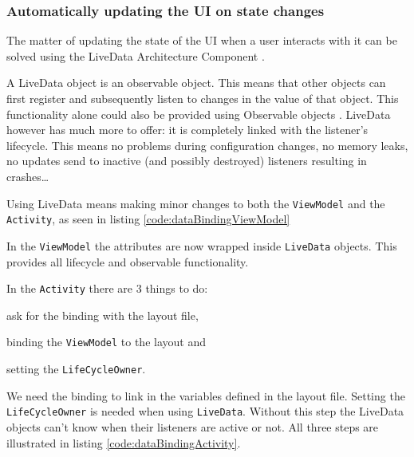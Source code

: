 \subsubsection{Automatically updating the UI on state changes}
The matter of updating the state of the UI when a user interacts with it can be solved using the LiveData Architecture Component \cite{liveData}.

A LiveData object is an observable object. This means that other objects can first register and subsequently listen to changes in the value of that object.
This functionality alone could also be provided using Observable objects \cite{observable}.
LiveData however has much more to offer: it is completely linked with the listener's lifecycle. This means no problems during configuration changes, no memory leaks, no updates send to inactive (and possibly destroyed) listeners resulting in crashes\ldots

Using LiveData means making minor changes to both the \lstinline!ViewModel! and the \lstinline!Activity!, as seen in listing \ref{code:dataBindingViewModel}

In the \lstinline!ViewModel! the attributes are now wrapped inside \lstinline!LiveData! objects.
This provides all lifecycle and observable functionality. 



In the \lstinline!Activity! there are 3 things to do:
\begin{inparaenum}[(i)]
	\item ask for the binding with the layout file,
	\item binding the \lstinline!ViewModel! to the layout and
	\item setting the \lstinline!LifeCycleOwner!.
\end{inparaenum}

We need the binding to link in the variables defined in the layout file. 
Setting the \lstinline!LifeCycleOwner! is needed when using \lstinline!LiveData!. 
Without this step the LiveData objects can't know when their listeners are active or not. All three steps are illustrated in listing \ref{code:dataBindingActivity}.




